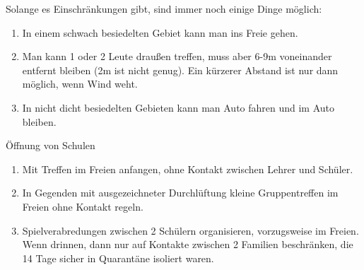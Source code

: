 \documentclass[onecolumn,journal]{IEEEtran}
\begin{document}
\begin{multicols}{2}
Solange es Einschränkungen gibt, sind immer noch einige Dinge möglich:
\begin{enumerate}
\item In einem schwach besiedelten Gebiet kann man ins Freie gehen.
\item Man kann 1 oder 2 Leute draußen treffen, muss aber 6-9m voneinander entfernt bleiben (2m ist nicht genug). Ein kürzerer Abstand ist nur dann möglich, wenn Wind weht.
\item In nicht dicht besiedelten Gebieten kann man Auto fahren und im Auto bleiben.
\end{enumerate}

Öffnung von Schulen
\begin{enumerate}
\item Mit Treffen im Freien anfangen, ohne Kontakt zwischen Lehrer und Schüler.
\item In Gegenden mit ausgezeichneter Durchlüftung kleine Gruppentreffen im Freien ohne Kontakt regeln.
\item Spielverabredungen zwischen 2 Schülern organisieren, vorzugsweise im Freien. Wenn drinnen, dann nur auf Kontakte zwischen 2 Familien beschränken, die 14 Tage sicher in Quarantäne isoliert waren. 
\end{enumerate}

\end{multicols}




% 
\end{document}

